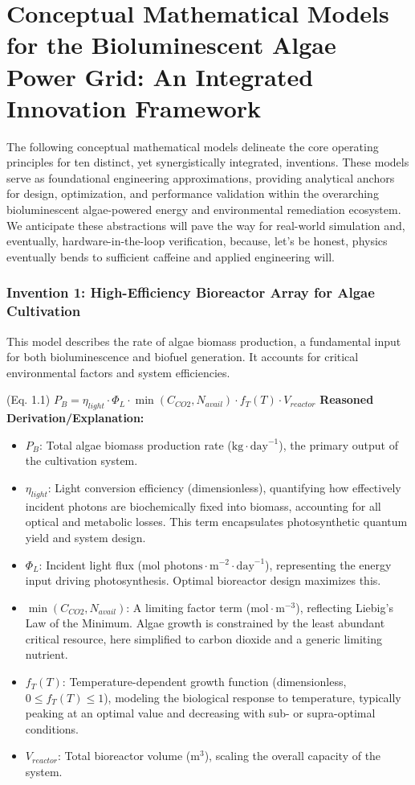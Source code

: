 \documentclass{article}
\newenvironment{reasonedderivation}{
    \textbf{Reasoned Derivation/Explanation:}
    \begin{itemize}
}{
    \end{itemize}
}
\begin{document}
\section*{Conceptual Mathematical Models for the Bioluminescent Algae Power Grid: An Integrated Innovation Framework}

The following conceptual mathematical models delineate the core operating principles for ten distinct, yet synergistically integrated, inventions. These models serve as foundational engineering approximations, providing analytical anchors for design, optimization, and performance validation within the overarching bioluminescent algae-powered energy and environmental remediation ecosystem. We anticipate these abstractions will pave the way for real-world simulation and, eventually, hardware-in-the-loop verification, because, let's be honest, physics eventually bends to sufficient caffeine and applied engineering will.

\subsubsection*{Invention 1: High-Efficiency Bioreactor Array for Algae Cultivation}
This model describes the rate of algae biomass production, a fundamental input for both bioluminescence and biofuel generation. It accounts for critical environmental factors and system efficiencies.

(Eq. 1.1) $P_B = \eta_{light} \cdot \Phi_L \cdot \min(C_{CO2}, N_{avail}) \cdot f_T(T) \cdot V_{reactor}$
\begin{reasonedderivation}
    \item $P_B$: Total algae biomass production rate ($\text{kg} \cdot \text{day}^{-1}$), the primary output of the cultivation system.
    \item $\eta_{light}$: Light conversion efficiency (dimensionless), quantifying how effectively incident photons are biochemically fixed into biomass, accounting for all optical and metabolic losses. This term encapsulates photosynthetic quantum yield and system design.
    \item $\Phi_L$: Incident light flux ($\text{mol photons} \cdot \text{m}^{-2} \cdot \text{day}^{-1}$), representing the energy input driving photosynthesis. Optimal bioreactor design maximizes this.
    \item $\min(C_{CO2}, N_{avail})$: A limiting factor term ($\text{mol} \cdot \text{m}^{-3}$), reflecting Liebig's Law of the Minimum. Algae growth is constrained by the least abundant critical resource, here simplified to carbon dioxide and a generic limiting nutrient.
    \item $f_T(T)$: Temperature-dependent growth function (dimensionless, $0 \le f_T(T) \le 1$), modeling the biological response to temperature, typically peaking at an optimal value and decreasing with sub- or supra-optimal conditions.
    \item $V_{reactor}$: Total bioreactor volume ($\text{m}^3$), scaling the overall capacity of the system.
\end{reasonedderivation}
\end{document}
